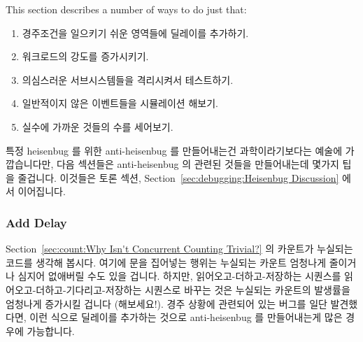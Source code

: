 This section describes a number of ways to do just that:
\fi

\begin{enumerate}
\item	경주조건을 일으키기 쉬운 영역들에 딜레이를 추가하기.
\item	워크로드의 강도를 증가시키기.
\item	의심스러운 서브시스템들을 격리시켜서 테스트하기.
\item	일반적이지 않은 이벤트들을 시뮬레이션 해보기.
\item	실수에 가까운 것들의 수를 세어보기.

\end{enumerate}

특정 heisenbug 를 위한 anti-heisenbug 를 만들어내는건 과학이라기보다는 예술에
가깝습니다만, 다음 섹션들은 anti-heisenbug 의 관련된 것들을 만들어내는데 몇가지
팁을 줄겁니다.
이것들은 토론 섹션,
Section~\ref{sec:debugging:Heisenbug Discussion}
에서 이어집니다.

\subsubsection{Add Delay}
\label{sec:debugging:Add Delay}

Section~\ref{sec:count:Why Isn't Concurrent Counting Trivial?} 의 카운트가
누실되는 코드를 생각해 봅시다.
여기에  문을 집어넣는 행위는 누실되는 카운트 엄청나게 줄이거나
심지어 없애버릴 수도 있을 겁니다.
하지만, 읽어오고-더하고-저장하는 시퀀스를 읽어오고-더하고-기다리고-저장하는
시퀀스로 바꾸는 것은 누실되는 카운트의 발생률을 엄청나게 증가시킬 겁니다
(해보세요!).
경주 상황에 관련되어 있는 버그를 일단 발견했다면, 이런 식으로 딜레이를 추가하는
것으로 anti-heisenbug 를 만들어내는게 많은 경우에 가능합니다.


